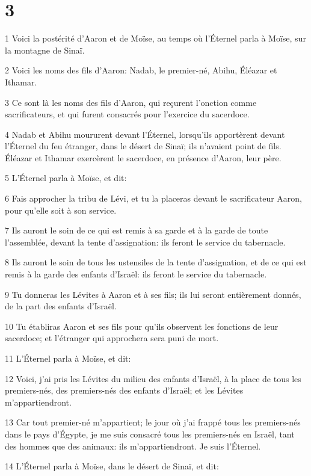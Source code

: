 \chapter{3}

\par 1 Voici la postérité d'Aaron et de Moïse, au temps où l'Éternel parla à Moïse, sur la montagne de Sinaï.
\par 2 Voici les noms des fils d'Aaron: Nadab, le premier-né, Abihu, Éléazar et Ithamar.
\par 3 Ce sont là les noms des fils d'Aaron, qui reçurent l'onction comme sacrificateurs, et qui furent consacrés pour l'exercice du sacerdoce.
\par 4 Nadab et Abihu moururent devant l'Éternel, lorsqu'ils apportèrent devant l'Éternel du feu étranger, dans le désert de Sinaï; ils n'avaient point de fils. Éléazar et Ithamar exercèrent le sacerdoce, en présence d'Aaron, leur père.
\par 5 L'Éternel parla à Moïse, et dit:
\par 6 Fais approcher la tribu de Lévi, et tu la placeras devant le sacrificateur Aaron, pour qu'elle soit à son service.
\par 7 Ils auront le soin de ce qui est remis à sa garde et à la garde de toute l'assemblée, devant la tente d'assignation: ils feront le service du tabernacle.
\par 8 Ils auront le soin de tous les ustensiles de la tente d'assignation, et de ce qui est remis à la garde des enfants d'Israël: ils feront le service du tabernacle.
\par 9 Tu donneras les Lévites à Aaron et à ses fils; ils lui seront entièrement donnés, de la part des enfants d'Israël.
\par 10 Tu établiras Aaron et ses fils pour qu'ils observent les fonctions de leur sacerdoce; et l'étranger qui approchera sera puni de mort.
\par 11 L'Éternel parla à Moïse, et dit:
\par 12 Voici, j'ai pris les Lévites du milieu des enfants d'Israël, à la place de tous les premiers-nés, des premiers-nés des enfants d'Israël; et les Lévites m'appartiendront.
\par 13 Car tout premier-né m'appartient; le jour où j'ai frappé tous les premiers-nés dans le pays d'Égypte, je me suis consacré tous les premiers-nés en Israël, tant des hommes que des animaux: ils m'appartiendront. Je suis l'Éternel.
\par 14 L'Éternel parla à Moïse, dans le désert de Sinaï, et dit:
